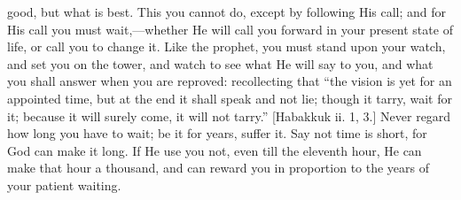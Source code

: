 good, but what is best. This you cannot do, except by following His
call; and for His call you must wait,—whether He will call you
forward in your present state of life, or call you to change it. Like
the prophet, you must stand upon your watch, and set you on the tower,
and watch to see what He will say to you, and what you shall answer
when you are reproved: recollecting that ``the vision is yet for
an appointed time, but at the end it shall speak and not lie; though
it tarry, wait for it; because it will surely come, it will not
tarry.'' [Habakkuk ii. 1, 3.] Never regard how long you have to
wait; be it for years, suffer it. Say not time is short, for God can
make it long. If He use you not, even till the eleventh hour, He can
make that hour a thousand, and can reward you in proportion to the
years of your patient waiting.

